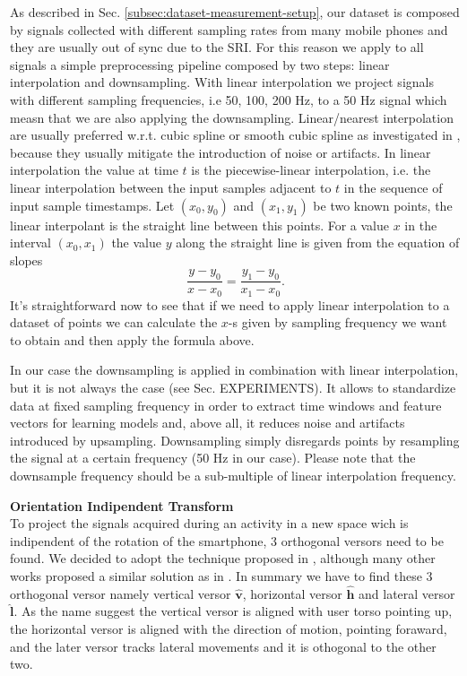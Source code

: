 As described in Sec. \ref{subsec:dataset-measurement-setup}, our
dataset is composed by signals collected with different sampling rates
from many mobile phones and they are usually out of sync due to the
SRI. For this reason we apply to all signals a simple preprocessing
pipeline composed by two steps: linear interpolation and
downsampling. With linear interpolation we project signals with
different sampling frequencies, i.e 50, 100, 200 Hz, to a 50 Hz signal
which measn that we are also applying the downsampling.
Linear/nearest interpolation are usually preferred w.r.t. cubic spline
or smooth cubic spline as investigated in \cite{stisen2015smart},
because they usually mitigate the introduction of noise or
artifacts. In linear interpolation the value at time $t$ is the
piecewise-linear interpolation, i.e. the linear interpolation between
the input samples adjacent to $t$ in the sequence of input sample
timestamps. Let $(x_0, y_0)$ and $(x_1, y_1)$ be two known points, the
linear interpolant is the straight line between this points. For a
value $x$ in the interval $(x_0, x_1)$ the value $y$ along the
straight line is given from the equation of slopes
\begin{equation}
  \label{eq:linear-interpolation}
  \frac{y - y_0}{x - x_0} = \frac{y_1 - y_0}{x_1 - x_0}.
\end{equation}
It's straightforward now to see that if we need to apply linear
interpolation to a dataset of points we can calculate the \mbox{$x$-s}
given by sampling frequency we want to obtain and then apply the
formula above.

In our case the downsampling is applied in combination with linear
interpolation, but it is not always the case (see
Sec. EXPERIMENTS). It allows to standardize data at fixed sampling
frequency in order to extract time windows and feature vectors for
learning models and, above all, it reduces noise and artifacts
introduced by upsampling. Downsampling simply disregards points by
resampling the signal at a certain frequency (50 Hz in our
case). Please note that the downsample frequency should be a
sub-multiple of linear interpolation frequency.

\textbf{Orientation Indipendent Transform}\\
To project the signals acquired during an activity in a new space wich is indipendent of the rotation of the smartphone, 3 orthogonal versors need to be found. We decided to adopt the technique proposed in \cite{gadaleta2018idnet}, although many other works proposed a similar solution as in \cite{kunze2009way, henpraserttae2011accurate}. In summary we have to find these 3 orthogonal versor namely vertical versor $\boldsymbol{\hat{v}}$, horizontal versor $\boldsymbol{\hat{h}}$ and lateral versor $\boldsymbol{\hat{l}}$. As the name suggest the vertical versor is aligned with user torso pointing up, the horizontal versor is aligned with the direction of motion, pointing foraward, and the later versor tracks lateral movements and it is othogonal to the other two.

